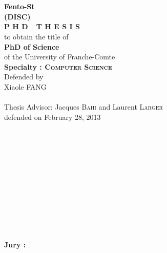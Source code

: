\documentclass[a4paper,11pt,twoside]{ThesisStyle}
\begin{document}
\begin{titlepage}
\begin{center}
 \\
\vspace*{0.3cm}
 \\
\noindent \textbf{Fento-St\\ (DISC) } \\
\vspace*{0.5cm}
\noindent \Huge \textbf{P H D\ \ T H E S I S} \\
\vspace*{0.3cm}
\noindent \large {to obtain the title of} \\
\vspace*{0.3cm}
\noindent \LARGE \textbf{PhD of Science} \\
\vspace*{0.3cm}
\noindent \Large of the University of Franche-Comte \\
\noindent \Large \textbf{Specialty : \textsc{Computer Science}}\\
\vspace*{0.4cm}
\noindent \large {Defended by\\}
\noindent \LARGE Xiaole \textsc{FANG} \\
\vspace*{0.8cm}
 \\
\vspace*{0.8cm}
\noindent \Large Thesis Advisor:  Jacques \textsc{Bahi} and Laurent \textsc{Larger}\\
\vspace*{0.2cm}
\noindent \large defended on February 28, 2013 
\vspace*{0.5cm}
\end{center}
\noindent \large \\ \\ \\ \\ \\ \\ \\ \\ \\ \\ \\
\textbf{Jury :} \\
\begin{center}
\noindent \large 

\end{center}
\end{titlepage}
\end{document}

